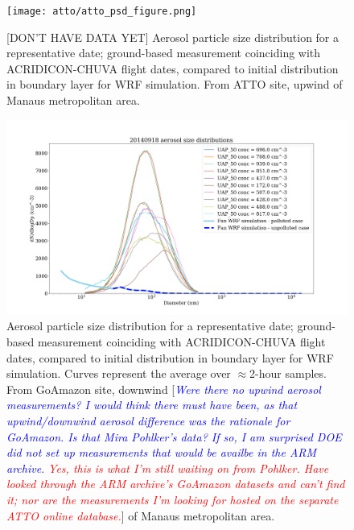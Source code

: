 \documentclass{article}
\newcommand{\drcomm}[1]{\textcolor{blue}{\textit{#1}}}
\newcommand{\klcomm}[1]{\textcolor{red}{\textit{#1}}}
\begin{document}
\clearpage
\newpage

\begin{figure}[ht]
    \centering
    \texttt{[image: atto/atto\_psd\_figure.png]}
    \caption{[DON'T HAVE DATA YET] Aerosol particle size distribution for a representative date; ground-based measurement coinciding with ACRIDICON-CHUVA flight dates, compared to initial distribution in boundary layer for WRF simulation. From ATTO site, upwind of Manaus metropolitan area.}
    \label{attoasd}
\end{figure}
\begin{figure}[ht]
    \centering
    \includegraphics[width=12cm]{goama/v6_aero_size_distb_20140918_figure.png}
    \caption{Aerosol particle size distribution for a representative date; ground-based measurement coinciding with ACRIDICON-CHUVA flight dates, compared to initial distribution in boundary layer for WRF simulation. Curves represent the average over $\approx$2-hour samples. From GoAmazon site, downwind [\drcomm{Were there no upwind aerosol measurements? I would think there must have been, as that upwind/downwind aerosol difference was the rationale for GoAmazon. Is that Mira Pohlker's data? If so, I am surprised DOE did not set up measurements that would be availbe in the ARM archive.} \klcomm{Yes, this is what I'm still waiting on from Pohlker. Have looked through the ARM archive's GoAmazon datasets and can't find it; nor are the measurements I'm looking for hosted on the separate ATTO online database.}] of Manaus metropolitan area.}
    \label{goaasd}
\end{figure}
\end{document}
